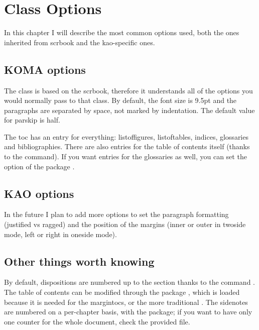 \setchapterpreamble[u]{\margintoc}
\chapter{Class Options}

In this chapter I will describe the most common options used, both the 
ones inherited from scrbook and the kao-specific ones.

\section{KOMA options}

The class is based on the scrbook, therefore it understands all of the 
options you would normally pass to that class. By default, the font size 
is 9.5pt and the paragraphs are separated by space, not marked by 
indentation. The default value for parskip is half.

The toc has an entry for everything: listoffigures, listoftables, 
indices, glossaries and bibliographies. There are also entries for the 
table of contents itself (thanks to the 
 command). If you want entries for the 
glossaries as well, you can set the  option of the package 
.

\section{KAO options}

In the future I plan to add more options to set the paragraph formatting 
(\eg justified vs ragged) and the position of the margins (inner or 
outer in twoside mode, left or right in oneside 
mode). 

\section{Other things worth knowing}

By default, dispositions are numbered up to the section thanks to the 
command . The table of contents 
can be modified through the package , which is loaded 
because it is needed for the margintocs, or the more traditional 
. The sidenotes are numbered on a per-chapter basis, 
with the  package; if you want to have only one 
counter for the whole document, check the provided  
file.

